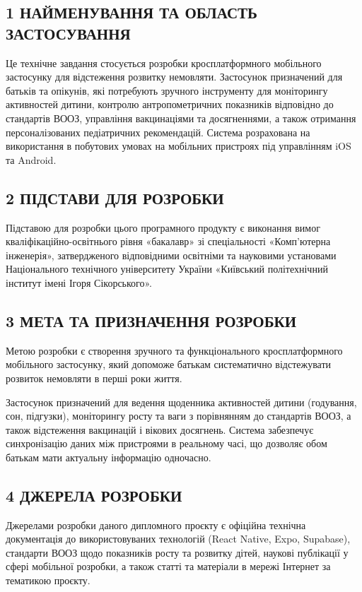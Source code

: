 
\begin{unnumbered}

\subsection{1 НАЙМЕНУВАННЯ ТА ОБЛАСТЬ ЗАСТОСУВАННЯ}

Це технічне завдання стосується розробки кросплатформного мобільного застосунку для відстеження розвитку немовляти. Застосунок призначений для батьків та опікунів, які потребують зручного інструменту для моніторингу активностей дитини, контролю антропометричних показників відповідно до стандартів ВООЗ, управління вакцинаціями та досягненнями, а також отримання персоналізованих педіатричних рекомендацій. Система розрахована на використання в побутових умовах на мобільних пристроях під управлінням iOS та Android.

\subsection{2 ПІДСТАВИ ДЛЯ РОЗРОБКИ}

Підставою для розробки цього програмного продукту є виконання вимог кваліфікаційно-освітнього рівня «бакалавр» зі спеціальності «Комп'ютерна інженерія», затвердженого відповідними освітніми та науковими установами Національного технічного університету України «Київський політехнічний інститут імені Ігоря Сікорського».

\subsection{3 МЕТА ТА ПРИЗНАЧЕННЯ РОЗРОБКИ}

Метою розробки є створення зручного та функціонального кросплатформного мобільного застосунку, який допоможе батькам систематично відстежувати розвиток немовляти в перші роки життя.

Застосунок призначений для ведення щоденника активностей дитини (годування, сон, підгузки), моніторингу росту та ваги з порівнянням до стандартів ВООЗ, а також відстеження вакцинацій і вікових досягнень. Система забезпечує синхронізацію даних між пристроями в реальному часі, що дозволяє обом батькам мати актуальну інформацію одночасно.

\subsection{4 ДЖЕРЕЛА РОЗРОБКИ}

Джерелами розробки даного дипломного проєкту є офіційна технічна документація до використовуваних технологій (React Native, Expo, Supabase), стандарти ВООЗ щодо показників росту та розвитку дітей, наукові публікації у сфері мобільної розробки, а також статті та матеріали в мережі Інтернет за тематикою проєкту.


\end{unnumbered}
